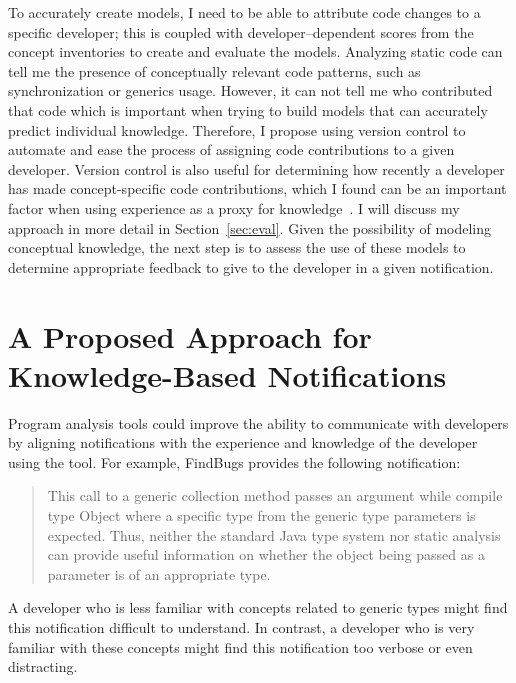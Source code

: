 \documentclass{llncs}
\begin{document}
To accurately create models, I need to be able to attribute code changes to a specific developer; this is coupled with developer--dependent scores from the concept inventories to create and evaluate the models. Analyzing static code can tell me the presence of conceptually relevant code patterns, such as synchronization or generics usage. However, it can not tell me who contributed that code which is important when trying to build models that can accurately predict individual knowledge. 
Therefore, I propose using version control to automate and ease the process of assigning code contributions to a given developer. 
Version control is also useful for determining how recently a developer has made concept-specific code contributions, which I found can be an important factor when using experience as a proxy for knowledge~\cite{johnson2015bespoke}. %
I will discuss my approach in more detail in Section~\ref{sec:eval}.
Given the possibility of modeling conceptual knowledge, the next step is to assess the use of these models to determine appropriate feedback to give to the developer in a given notification.


\section{A Proposed Approach for Knowledge-Based Notifications}
Program analysis tools could improve the ability to communicate with developers by aligning notifications with the experience and knowledge of the developer using the tool.
For example, FindBugs provides the following notification:

\vspace*{-1ex}
\begin{quotation}
	\noindent \small{
		This call to a generic collection method passes an argument while compile type Object where a specific type from the generic type parameters is expected. Thus, neither the standard Java type system nor static analysis can provide useful information on whether the object being passed as a parameter is of an appropriate type.}
\end{quotation}
\vspace*{-1ex}

\noindent
A developer who is less familiar with concepts related to generic types might find this notification difficult to understand. 
In contrast, a developer who is very familiar with these concepts might find this notification too verbose or even distracting.
\end{document}
